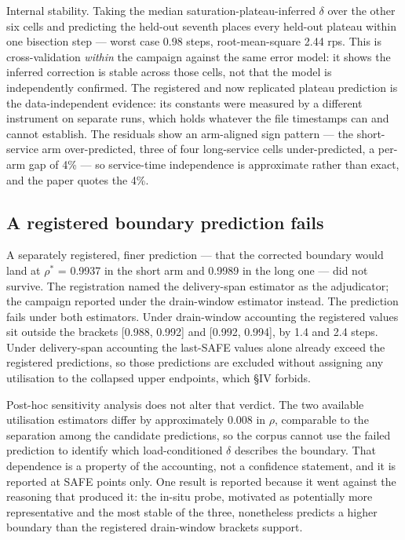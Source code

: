 \documentclass{ieeeaccess}
\begin{document}
Internal stability. Taking the median saturation-plateau-inferred $\delta$ over the other six cells and predicting the held-out seventh places every held-out plateau within one bisection step --- worst case 0.98 steps, root-mean-square 2.44 rps. This is cross-validation \textit{within} the campaign against the same error model: it shows the inferred correction is stable across those cells, not that the model is independently confirmed. The registered and now replicated plateau prediction is the data-independent evidence: its constants were measured by a different instrument on separate runs, which holds whatever the file timestamps can and cannot establish. The residuals show an arm-aligned sign pattern --- the short-service arm over-predicted, three of four long-service cells under-predicted, a per-arm gap of 4\% --- so service-time independence is approximate rather than exact, and the paper quotes the 4\%.

\subsection{A registered boundary prediction fails}

A separately registered, finer prediction --- that the corrected boundary would land at $\rho^{*}$ = 0.9937 in the short arm and 0.9989 in the long one --- did not survive. The registration named the delivery-span estimator as the adjudicator; the campaign reported under the drain-window estimator instead. The prediction fails under both estimators. Under drain-window accounting the registered values sit outside the brackets [0.988, 0.992] and [0.992, 0.994], by 1.4 and 2.4 steps. Under delivery-span accounting the last-SAFE values alone already exceed the registered predictions, so those predictions are excluded without assigning any utilisation to the collapsed upper endpoints, which \S{}IV forbids.

Post-hoc sensitivity analysis does not alter that verdict. The two available utilisation estimators differ by approximately 0.008 in $\rho$, comparable to the separation among the candidate predictions, so the corpus cannot use the failed prediction to identify which load-conditioned $\delta$ describes the boundary. That dependence is a property of the accounting, not a confidence statement, and it is reported at SAFE points only. One result is reported because it went against the reasoning that produced it: the in-situ probe, motivated as potentially more representative and the most stable of the three, nonetheless predicts a higher boundary than the registered drain-window brackets support.
\end{document}
